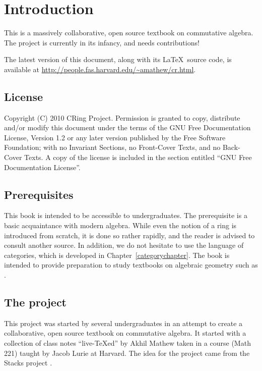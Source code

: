 \nocite{*}

\chapter*{Introduction}

This is a massively collaborative, open source textbook on commutative
algebra. The project is currently in its infancy, and needs contributions!

The latest version of this document, along with its \LaTeX\ source code, is
available at \url{http://people.fas.harvard.edu/~amathew/cr.html}.

\section*{License}

Copyright (C) 2010 CRing Project.  Permission is granted to copy, distribute
and/or modify this document under the terms of the GNU Free Documentation
License, Version 1.2 or any later version published by the Free Software
Foundation; with no Invariant Sections, no Front-Cover Texts, and no
Back-Cover Texts. A copy of the license is included in the section entitled
``GNU Free Documentation License''.

\section*{Prerequisites}

This book is intended to be accessible to undergraduates. The prerequisite is
a basic acquaintance with modern algebra. While even the notion of a ring is
introduced from scratch, it is done so rather rapidly, and the reader is
advised to consult another source. In addition, we do not hesitate to use the
language of categories, which is developed in Chapter~\ref{categorychapter}.
The book is intended to provide preparation to study textbooks on algebraic
geometry such as \cite{Ha77}.

\section*{The project}

This project was started by several undergraduates in an attempt to create
a collaborative, open source textbook on commutative algebra.  It started with
a collection of class notes ``live-\TeX ed'' by Akhil Mathew taken in a course
(Math 221) taught by Jacob Lurie at Harvard. The idea for the project came
from the Stacks project \cite{St10}.

